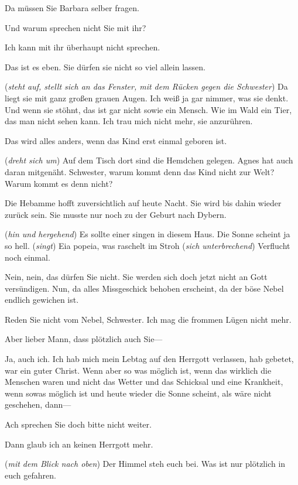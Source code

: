 \documentclass[
	final,
	a4paper,
	ngerman,
	mpinclude = true, %
	twoside = true,
	open = right,
	cleardoublepage = plain,
	DIV = 13,
	BCOR = 1cm,
	titlepage = firstiscover,
	]{scrbook}
\newcommand{\direction}[1]{(\textit{#1})}
\newcommand{\thecharacter}[1]{\textup{\textsc{#1}}\xspace}
\newcommand{\theJosef}{\thecharacter{Josef}}
\newcommand{\character}[1]{\item[#1]}
\newcommand{\Josef}{\character{\theJosef}}
\newcommand{\Heilsarmeeschwester}{\character{Schwester}}
\begin{document}
\begin{play}
\Josef
Da müssen Sie Barbara selber fragen.

\Heilsarmeeschwester
Und warum sprechen nicht Sie mit ihr?

\Josef
Ich kann mit ihr überhaupt nicht sprechen.

\Heilsarmeeschwester
Das ist es eben. Sie dürfen sie nicht so viel allein lassen.

\Josef
\direction{steht auf, stellt sich an das Fenster, mit dem Rücken gegen die Schwester} Da liegt sie mit ganz großen grauen Augen. Ich weiß ja gar nimmer, was sie denkt. Und wenn sie stöhnt, das ist gar nicht sowie ein Mensch. Wie im Wald ein Tier, das man nicht sehen kann. Ich trau mich nicht mehr, sie anzurühren.

\Heilsarmeeschwester
Das wird alles anders, wenn das Kind erst einmal geboren ist.

\Josef
\direction{dreht sich um} Auf dem Tisch dort sind die Hemdchen gelegen. Agnes hat auch daran mitgenäht. Schwester, warum kommt denn das Kind nicht zur Welt? Warum kommt es denn nicht?
 
\Heilsarmeeschwester
Die Hebamme hofft zuversichtlich auf heute Nacht. Sie wird bis dahin wieder zurück sein. Sie musste nur noch zu der Geburt nach Dybern.

\Josef
\direction{hin und hergehend} Es sollte einer singen in diesem Haus. Die Sonne scheint ja so hell. \direction{singt} Eia popeia, was raschelt im Stroh \direction{sich unterbrechend} Verflucht noch einmal.

\Heilsarmeeschwester
Nein, nein, das dürfen Sie nicht. Sie werden sich doch jetzt nicht an Gott versündigen. Nun, da alles Missgeschick behoben erscheint, da der böse Nebel endlich gewichen ist.

\Josef
Reden Sie nicht vom Nebel, Schwester. Ich mag die frommen Lügen nicht mehr.

\Heilsarmeeschwester
Aber lieber Mann, dass plötzlich auch Sie---

\Josef
Ja, auch ich. Ich hab mich mein Lebtag auf den Herrgott verlassen, hab gebetet, war ein guter Christ. Wenn aber so was möglich ist, wenn das wirklich die Menschen waren und nicht das Wetter und das Schicksal und eine Krankheit, wenn sowas möglich ist und heute wieder die Sonne scheint, als wäre nicht geschehen, dann---

\Heilsarmeeschwester
Ach sprechen Sie doch bitte nicht weiter.

\Josef
Dann glaub ich an keinen Herrgott mehr.

\Heilsarmeeschwester
\direction{mit dem Blick nach oben} Der Himmel steh euch bei. Was ist nur plötzlich in euch gefahren.


\end{play}
\end{document}

